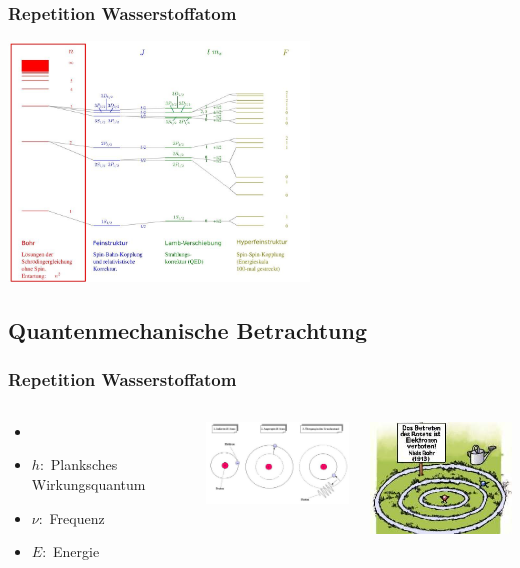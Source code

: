
\begin{frame}
	\frametitle {Repetition Wasserstoffatom}
	\begin{center}
		\includegraphics[width = 8cm]{./pictures/energieniveaus1}
	\end{center}
\end{frame}


\subsection{Quantenmechanische Betrachtung}

\begin{frame}
  \frametitle{Repetition Wasserstoffatom}
	\begin{columns}
			 \begin{itemize} 
			\item[] 
			\item[]   $h:$ Planksches  Wirkungsquantum
		 	\item[]   $\nu:$ Frequenz
		 	\item[]   $E: $ Energie
		 	\end{itemize}		 			 	
		 	\includegraphics[width = 5cm]{./pictures/wasserstoffBohr}
		 	
			\includegraphics[width = 5cm]{./pictures/verbot}
	
	\end{columns}

\end{frame}


